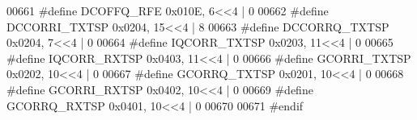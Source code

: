 \begin{DoxyCode}
00661 \textcolor{preprocessor}{#define DCOFFQ\_RFE 0x010E, 6<<4 | 0}
00662 \textcolor{preprocessor}{#define DCCORRI\_TXTSP 0x0204, 15<<4 | 8}
00663 \textcolor{preprocessor}{#define DCCORRQ\_TXTSP 0x0204, 7<<4 | 0}
00664 \textcolor{preprocessor}{#define IQCORR\_TXTSP 0x0203, 11<<4 | 0}
00665 \textcolor{preprocessor}{#define IQCORR\_RXTSP 0x0403, 11<<4 | 0}
00666 \textcolor{preprocessor}{#define GCORRI\_TXTSP 0x0202, 10<<4 | 0}
00667 \textcolor{preprocessor}{#define GCORRQ\_TXTSP 0x0201, 10<<4 | 0}
00668 \textcolor{preprocessor}{#define GCORRI\_RXTSP 0x0402, 10<<4 | 0}
00669 \textcolor{preprocessor}{#define GCORRQ\_RXTSP 0x0401, 10<<4 | 0}
00670 
00671 \textcolor{preprocessor}{#endif}
\end{DoxyCode}
